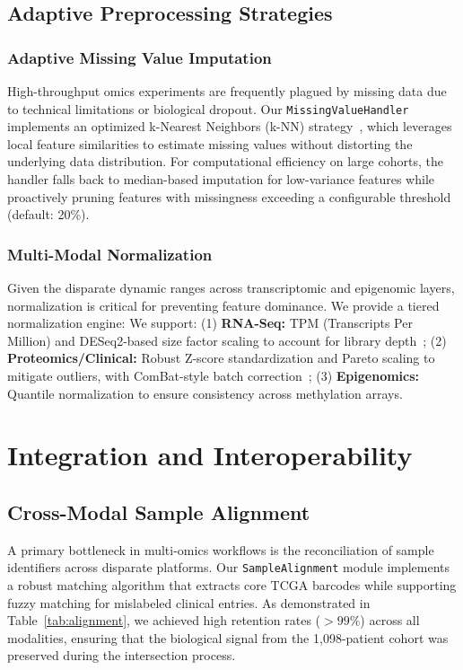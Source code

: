 \documentclass[runningheads]{llncs}
\begin{document}
\subsection{Adaptive Preprocessing Strategies}

\subsubsection{Adaptive Missing Value Imputation}
High-throughput omics experiments are frequently plagued by missing data due to technical limitations or biological dropout. Our \texttt{MissingValueHandler} implements an optimized k-Nearest Neighbors (k-NN) strategy~\cite{troyanskaya2001}, which leverages local feature similarities to estimate missing values without distorting the underlying data distribution. For computational efficiency on large cohorts, the handler falls back to median-based imputation for low-variance features while proactively pruning features with missingness exceeding a configurable threshold (default: 20\%).

\subsubsection{Multi-Modal Normalization}
Given the disparate dynamic ranges across transcriptomic and epigenomic layers, normalization is critical for preventing feature dominance. We provide a tiered normalization engine:
We support: (1) \textbf{RNA-Seq:} TPM (Transcripts Per Million) and DESeq2-based size factor scaling to account for library depth~\cite{ritchie2015}; (2) \textbf{Proteomics/Clinical:} Robust Z-score standardization and Pareto scaling to mitigate outliers, with ComBat-style batch correction~\cite{johnson2007}; (3) \textbf{Epigenomics:} Quantile normalization to ensure consistency across methylation arrays.

\section{Integration and Interoperability}\label{sec:integration}

\subsection{Cross-Modal Sample Alignment}
A primary bottleneck in multi-omics workflows is the reconciliation of sample identifiers across disparate platforms. Our \texttt{SampleAlignment} module implements a robust matching algorithm that extracts core TCGA barcodes while supporting fuzzy matching for mislabeled clinical entries. As demonstrated in Table~\ref{tab:alignment}, we achieved high retention rates ($>99\%$) across all modalities, ensuring that the biological signal from the 1,098-patient cohort was preserved during the intersection process.
\end{document}
